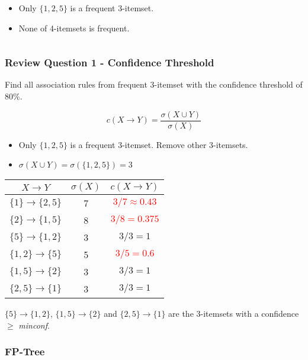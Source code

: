\documentclass[aspectratio=169, 10pt]{beamer}
\begin{document}
\begin{frame}[t]
\begin{columns}
\begin{column}{0.5\textwidth}
        \begin{itemize}
            \item Only $\{1, 2, 5\}$ is a frequent 3-itemset.
            \item None of 4-itemsets is frequent.
        \end{itemize}
    \end{column}
\end{columns}

\end{frame}

\begin{frame}[t]
    \frametitle{Review Question 1 - Confidence Threshold}
    \small

    Find all association rules from frequent 3-itemset with the confidence threshold of 80\%.
    
    \[ c(X \to Y) = \frac{\sigma(X \cup Y)}{\sigma(X)} \] 

    \begin{itemize}
        \item Only $\{1, 2, 5\}$ is a frequent 3-itemset. Remove other 3-itemsets.
        \item $\sigma(X \cup Y) = \sigma (\{ 1, 2, 5\}) = 3$
    \end{itemize}

    \begin{table}[]
        \footnotesize
        \begin{tabular}{c|c|c}
        $X \to Y$                & $\sigma(X)$ & $c(X \to Y)$ \\ \hline
        $\{ 1 \} \to \{  2, 5\}$ & 7           & \textcolor{red}{$3/7 \approx 0.43$} \\ 
        $\{ 2 \} \to \{  1, 5\}$ & 8           & \textcolor{red}{$3/8 = 0.375$} \\ 
        $\{ 5 \} \to \{  1, 2\}$ & 3           & $3/3 = 1$ \\ 
        $\{ 1, 2 \} \to \{  5\}$ & 5           & \textcolor{red}{$3/5 = 0.6$} \\ 
        $\{ 1, 5 \} \to \{  2\}$ & 3           & $3/3 = 1$ \\ 
        $\{ 2, 5 \} \to \{  1\}$ & 3           & $3/3 = 1$ \\ 
        \end{tabular}
    \end{table}

    $\{ 5 \} \to \{  1, 2\}$, $\{ 1, 5 \} \to \{  2\}$ and $\{ 2, 5 \} \to \{  1\}$ are the 3-itemsets with a confidence $\geq$ \textit{minconf}.

\end{frame}

\begin{frame}[t]
\frametitle{FP-Tree}
    
    
\end{frame}
\end{document}
